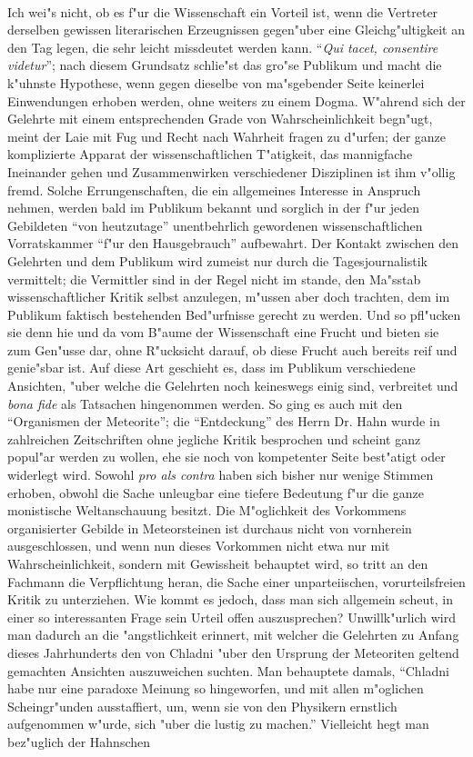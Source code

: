 \documentclass[a4paper, 12pt, oneside]{article}
\begin{document}
\paragraph{}
Ich wei"s nicht, ob es f"ur die Wissenschaft ein Vorteil ist, wenn die Vertreter derselben gewissen literarischen Erzeugnissen gegen"uber eine Gleichg"ultigkeit an den Tag legen, die sehr leicht missdeutet werden kann. "`\emph{Qui tacet, consentire videtur}"'; nach diesem Grundsatz schlie"st das gro"se Publikum und macht die k"uhnste Hypothese, wenn gegen dieselbe von ma"sgebender Seite keinerlei Einwendungen erhoben werden, ohne weiters zu einem Dogma. W"ahrend sich der Gelehrte mit einem entsprechenden Grade von Wahrscheinlichkeit begn"ugt, meint der Laie mit Fug und Recht nach Wahrheit fragen zu d"urfen; der ganze komplizierte Apparat der wissenschaftlichen T"atigkeit, das mannigfache Ineinander gehen und Zusammenwirken verschiedener Disziplinen ist ihm v"ollig fremd. Solche Errungenschaften, die ein allgemeines Interesse in Anspruch nehmen, werden bald im Publikum bekannt und sorglich in der f"ur jeden Gebildeten "`von heutzutage"' unentbehrlich gewordenen wissenschaftlichen Vorratskammer "`f"ur den Hausgebrauch"' aufbewahrt. Der Kontakt zwischen den Gelehrten und dem Publikum wird zumeist nur durch die Tagesjournalistik vermittelt; die Vermittler sind in der Regel nicht im stande, den Ma"sstab wissenschaftlicher Kritik selbst anzulegen, m"ussen aber doch trachten, dem im Publikum faktisch bestehenden Bed"urfnisse gerecht zu werden. Und so pfl"ucken sie denn hie und da vom B"aume der Wissenschaft eine Frucht und bieten sie zum Gen"usse dar, ohne R"ucksicht darauf, ob diese Frucht auch bereits reif und genie"sbar ist. Auf diese Art geschieht es, dass im Publikum verschiedene Ansichten, "uber welche die Gelehrten noch keineswegs einig sind, verbreitet und \emph{bona fide} als Tatsachen hingenommen werden. So ging es auch mit den "`Organismen der Meteorite"'; die "`Entdeckung"' des Herrn Dr. Hahn wurde in zahlreichen Zeitschriften ohne jegliche Kritik besprochen und scheint ganz popul"ar werden zu wollen, ehe sie noch von kompetenter Seite best"atigt oder widerlegt wird. Sowohl \emph{pro als contra} haben sich bisher nur wenige Stimmen erhoben, obwohl die Sache unleugbar eine tiefere Bedeutung f"ur die ganze monistische Weltanschauung besitzt. Die M"oglichkeit des Vorkommens organisierter Gebilde in Meteorsteinen ist durchaus nicht von vornherein ausgeschlossen, und wenn nun dieses Vorkommen nicht etwa nur mit Wahrscheinlichkeit, sondern mit Gewissheit behauptet wird, so tritt an den Fachmann die Verpflichtung heran, die Sache einer unparteiischen, vorurteilsfreien Kritik zu unterziehen. Wie kommt es jedoch, dass man sich allgemein scheut, in einer so interessanten Frage sein Urteil offen auszusprechen? Unwillk"urlich wird man dadurch an die "angstlichkeit erinnert, mit welcher die Gelehrten zu Anfang dieses Jahrhunderts den von Chladni "uber den Ursprung der Meteoriten geltend gemachten Ansichten auszuweichen suchten. Man behauptete damals, "`Chladni habe nur eine paradoxe Meinung so hingeworfen, und mit allen m"oglichen Scheingr"unden ausstaffiert, um, wenn sie von den Physikern ernstlich aufgenommen w"urde, sich "uber die lustig zu machen."' Vielleicht hegt man bez"uglich der Hahnschen 
\end{document}
